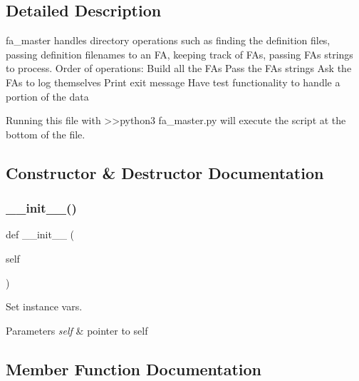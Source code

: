 \subsection{Detailed Description}
\begin{DoxyVerb}fa_master handles directory operations such as finding the definition files,
passing definition filenames to an FA, keeping track of FAs, passing FAs strings
to process.  Order of operations:
Build all the FAs
Pass the FAs strings
Ask the FAs to log themselves
Print exit message
Have test functionality to handle a portion of the data

Running this file with >>python3 fa_master.py will execute the script at the bottom of the file.
\end{DoxyVerb}
 

\subsection{Constructor \& Destructor Documentation}
\mbox{\label{classfa__master_1_1_f_a___master_ae64f0875afe3067b97ba370b354b9213}} 
\subsubsection{\texorpdfstring{\+\_\+\+\_\+init\+\_\+\+\_\+()}{\_\_init\_\_()}}
{\footnotesize\ttfamily def \+\_\+\+\_\+init\+\_\+\+\_\+ (\begin{DoxyParamCaption}\item[{}]{self }\end{DoxyParamCaption})}



Set instance vars. 


\begin{DoxyParams}{Parameters}
{\em self} & pointer to self \\
\hline
\end{DoxyParams}


\subsection{Member Function Documentation}
\mbox{\label{classfa__master_1_1_f_a___master_a320c46eeb8a995f713fbfb8b5f77fee2}} 
